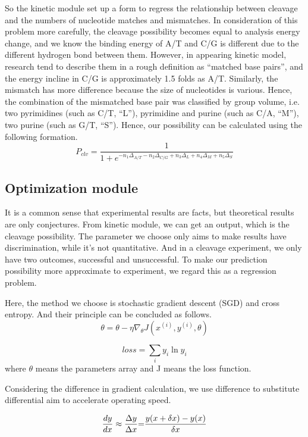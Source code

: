 So the kinetic module set up a form to regress the relationship between cleavage and the numbers of nucleotide matches and mismatches.
In consideration of this problem more carefully, the cleavage possibility becomes equal to analysis energy change, and we know the binding energy of A/T and C/G is different due to the different hydrogen bond between them. However, in appearing kinetic model, research tend to describe them in a rough definition as “matched base pairs”, and the energy incline in C/G is approximately 1.5 folds as A/T. Similarly, the mismatch has more difference because the size of nucleotides is various. Hence, the combination of the mismatched base pair was classified by group volume, i.e. two pyrimidines (such as C/T, “L”), pyrimidine and purine (such as C/A, “M”), two purine (such as G/T, “S”). Hence, our possibility can be calculated using the following formation.
\begin{equation}
P_{clv}=\frac{1}{1+e^{-n_1\Delta_{A/T}-n_2\Delta_{C/G}+n_3\Delta_{L}+n_4\Delta_{M}+n_5\Delta_{S}}}
\end{equation}

\subsection{Optimization module}
It is a common sense that experimental results are facts, but theoretical results are only conjectures. From kinetic module, we can get an output, which is the cleavage possibility. The parameter we choose only aims to make results have discrimination, while it’s not quantitative. And in a cleavage experiment, we only have two outcomes, successful and unsuccessful. To make our prediction possibility more approximate to experiment, we regard this as a regression problem.

Here, the method we choose is stochastic gradient descent (SGD) and cross entropy. And their principle can be concluded as follows.
\begin{equation}
\theta  = \theta  - \eta {\nabla _\theta }J({x^{(i)}},{y^{(i)}},\theta )
\end{equation}
	
\begin{equation}
loss = \sum\limits_i {{y_i}\ln {y_i}}
\end{equation}
where $\theta$ means the parameters array and J means the loss function. 

Considering the difference in gradient calculation, we use difference to substitute differential aim to accelerate operating speed.\par
\begin{equation}
\frac{{dy}}{{dx}} \approx \frac{{\Delta y}}{{\Delta x}}{\rm{ = }}\frac{{y(x + \delta x) - y(x)}}{{\delta x}}
\end{equation}

